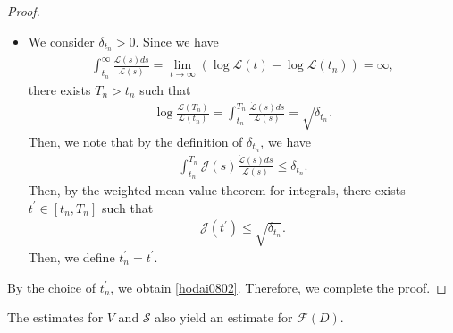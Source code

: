 \documentclass[10pt,a4paper]{amsart}
\numberwithin{equation}{section}
\begin{document}
\begin{proof}
\begin{itemize}
\item We consider $\delta_{t_n}>0$. Since we have
\begin{align*}
\int_{t_n}^{\infty}\frac{\dot{\mathcal{L}}(s)ds}{\mathcal{L}(s)}=\lim_{t\to\infty}\left(\log{\mathcal{L}}(t)-\log{\mathcal{L}(t_n)}\right)=\infty,
\end{align*}
there exists $T_n>t_n$ such that 
\begin{align*}
\log{\frac{\mathcal{L}(T_n)}{\mathcal{L}(t_n)}}=\int_{t_n}^{T_n}\frac{\dot{\mathcal{L}}(s)ds}{\mathcal{L}(s)}=\sqrt{\delta_{t_n}}.
\end{align*}
Then, we note that by the definition of $\delta_{t_n}$, we have
\begin{align*}
\int_{t_n}^{T_n}\mathcal{J}(s)\frac{\dot{\mathcal{L}}(s)ds}{\mathcal{L}(s)}\leq \delta_{t_n}.
\end{align*}
Then, by the weighted mean value theorem for integrals, there exists $t^{\prime}\in [t_n,T_n]$ such that 
\begin{align*}
\mathcal{J}(t^{\prime})\leq \sqrt{\delta_{t_n}}.
\end{align*}
Then, we define $t_n^{\prime}=t^{\prime}$.
\end{itemize}
By the choice of $t_n^{\prime}$, we obtain \eqref{hodai0802}. Therefore, we complete the proof.
\end{proof}

The estimates for $V$ and $\mathcal{S}$ also yield an estimate for $\mathcal{F}(D)$.
\end{document}
